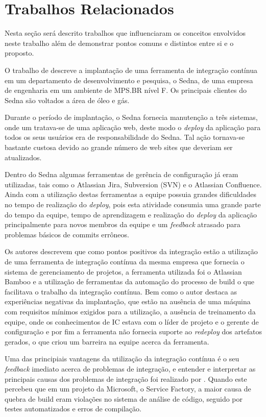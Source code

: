 \chapter{Trabalhos Relacionados}\label{trabalhorel}
Nesta seção será descrito trabalhos que influenciaram os conceitos envolvidos neste trabalho além de demonstrar pontos comuns e distintos entre si e o proposto.

O trabalho de  descreve a implantação de uma ferramenta de integração contínua em um departamento de desenvolvimento e pesquisa, o Sedna, de uma empresa de engenharia em um ambiente de MPS.BR nível F. Os principais clientes do Sedna são voltados a área de óleo e gás.

Durante o período de implantação, o Sedna fornecia manutenção a três sistemas, onde um tratava-se de uma aplicação web, deste modo o \textit{deploy} da aplicação para todos os seus usuários era de responsabilidade do Sedna. Tal ação tornava-se bastante custosa devido ao grande número de web sites que deveriam ser atualizados.
	
Dentro do Sedna algumas ferramentas de gerência de configuração já eram utilizadas, tais como o Atlassian Jira, Subversion (SVN) e o Atlassian Confluence. Ainda com a utilização destas ferramentas a equipe possuia grandes dificuldades no tempo de realização do \textit{deploy}, pois esta atividade consumia uma grande parte do tempo da equipe, tempo de aprendizagem e realização do \textit{deploy} da aplicação principalmente para novos membros da equipe e um \textit{feedback} atrasado para problemas básicos de commits errôneos.

Os autores descrevem que como pontos positivos da integração estão a utilização de uma ferramenta de integração contínua da mesma empresa que fornecia o sistema de gerenciamento de projetos, a ferramenta utilizada foi o Atlassian Bamboo e a utilização de ferramentas da automação do processo de build o que facilitava o trabalho da integração contínua. Bem como o autor destaca as experiências negativas da implantação, que estão na ausência de uma máquina com requisitos mínimos exigidos para a utilização, a ausência de treinamento da equipe, onde os conhecimentos de IC estava com o líder de projeto e o gerente de configuração e por fim a ferramenta não fornecia suporte ao \textit{redeploy} dos artefatos gerados, o que criou um barreira na equipe acerca da ferramenta.


Uma das principiais vantagens da utilização da integração contínua é o seu \textit{feedback} imediato acerca de problemas de integração, e entender e interpretar as principais causas dos problemas de integração foi realizado por . Quando este percebeu que em um projeto da Microsoft, o Service Factory, a maior causa de quebra de build eram violações no sistema de análise de código, seguido por testes automatizados e erros de compilação.


